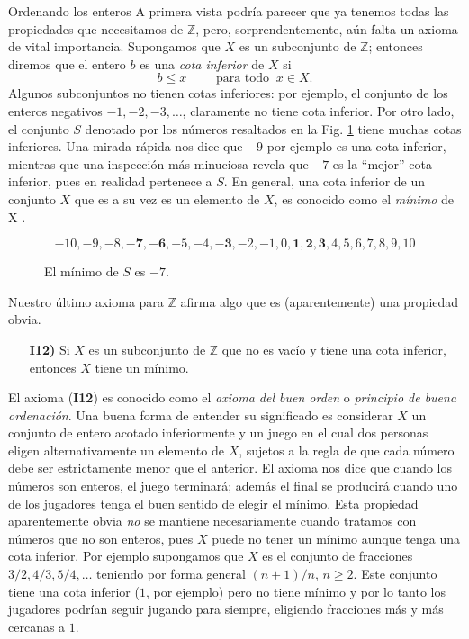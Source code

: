 \begin{section}{Ordenando los enteros}
A primera vista podría parecer que ya tenemos todas las
propiedades que necesitamos de $\mathbb Z$, pero, sorprendentemente, aún falta un axioma de vital importancia.
Supongamos que $X$ es un subconjunto de $\mathbb Z$; entonces
diremos que el entero $b$ es una {\em cota inferior} de $X$ si
$$
b\le x \qquad \text{ para todo } \ x \in X.
$$
Algunos subconjuntos no tienen cotas inferiores: por ejemplo, el
conjunto de los enteros negativos $-1, -2, -3, \ldots$, claramente no
tiene cota inferior. Por otro lado, el conjunto $S$ denotado por
los números resaltados en la Fig. \ref{f1.1} tiene muchas cotas
inferiores. Una mirada rápida nos dice que $-9$ por ejemplo es una
cota inferior, mientras que una inspección más minuciosa revela
que $-7$ es la ``mejor'' cota inferior, pues en realidad pertenece
a $S$. En general, una cota inferior de un conjunto $X$ que es a
su vez es un elemento de $X$, es conocido como el {\em mínimo} de
X .



\begin{figure}[ht]
$$
-10, -9, -8, \mathbf{-7}, \mathbf{-6}, -5, -4, \mathbf{-3}, -2, -1, 0, \mathbf{1}, \mathbf{2}, \mathbf{3}, 
4, 5, 6, 7, 8, 9, 10
$$
\caption{El mínimo de $S$ es $-7$.}\label{f1.1}
\end{figure}


Nuestro último axioma para $\mathbb Z$ afirma algo que es
(aparentemente) una propiedad obvia.

\begin{enumerate}
\item[{\bf I12)}] Si $X$ es un subconjunto de $\mathbb Z$ que no es
vacío y tiene una cota inferior, entonces $X$ tiene un mínimo.
\end{enumerate}

El axioma ({\bf I12}) es conocido como el {\em axioma del buen orden} o {\em principio de buena ordenación}. 
Una buena forma de entender su significado es considerar $X$ un conjunto de entero acotado inferiormente  y un juego en el cual dos personas eligen alternativamente un
elemento de $X$, sujetos a la regla de que cada número debe ser
estrictamente menor que el anterior. El axioma nos dice que cuando
los números son enteros, el juego terminará; además el final se
producirá cuando uno de los jugadores tenga el buen sentido de
elegir el mínimo. Esta propiedad aparentemente obvia {\it no} se
mantiene necesariamente cuando tratamos con números que no son
enteros, pues $X$ puede no tener un mínimo aunque tenga una cota
inferior. Por ejemplo supongamos que $X$ es el conjunto de
fracciones $3/2, 4/3, 5/4, \ldots$ teniendo por forma general
$(n+1)/n$, $n\ge 2$. Este conjunto tiene una cota inferior ($1$, por
ejemplo) pero no tiene mínimo y por lo tanto los jugadores podrían
seguir jugando para siempre, eligiendo fracciones más y más
cercanas a $1$.


\end{section}

